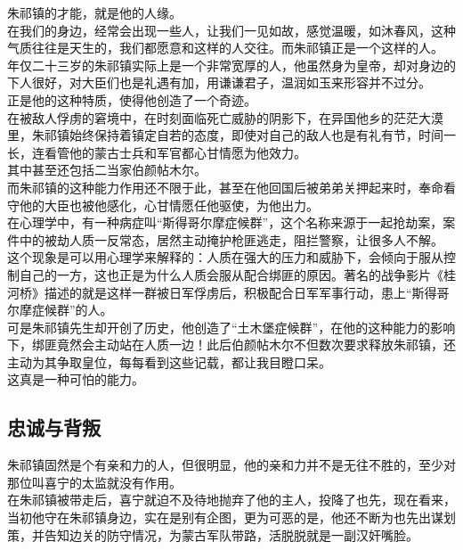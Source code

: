 \begin{multicols}{\theparacolNo}
朱祁镇的才能，就是他的人缘。\\

在我们的身边，经常会出现一些人，让我们一见如故，感觉温暖，如沐春风，这种气质往往是天生的，我们都愿意和这样的人交往。而朱祁镇正是一个这样的人。\\

年仅二十三岁的朱祁镇实际上是一个非常宽厚的人，他虽然身为皇帝，却对身边的下人很好，对大臣们也是礼遇有加，用谦谦君子，温润如玉来形容并不过分。\\

正是他的这种特质，使得他创造了一个奇迹。\\

在被敌人俘虏的窘境中，在时刻面临死亡威胁的阴影下，在异国他乡的茫茫大漠里，朱祁镇始终保持着镇定自若的态度，即使对自己的敌人也是有礼有节，时间一长，连看管他的蒙古士兵和军官都心甘情愿为他效力。\\

其中甚至还包括二当家伯颜帖木尔。\\

而朱祁镇的这种能力作用还不限于此，甚至在他回国后被弟弟关押起来时，奉命看守他的大臣也被他感化，心甘情愿任他驱使，为他出力。\\

在心理学中，有一种病症叫“斯得哥尔摩症候群”，这个名称来源于一起抢劫案，案件中的被劫人质一反常态，居然主动掩护枪匪逃走，阻拦警察，让很多人不解。\\

这个现象是可以用心理学来解释的：人质在强大的压力和威胁下，会倾向于服从控制自己的一方，这也正是为什么人质会服从配合绑匪的原因。著名的战争影片《桂河桥》描述的就是这样一群被日军俘虏后，积极配合日军军事行动，患上“斯得哥尔摩症候群”的人。\\

可是朱祁镇先生却开创了历史，他创造了“土木堡症候群”，在他的这种能力的影响下，绑匪竟然会主动站在人质一边！此后伯颜帖木尔不但数次要求释放朱祁镇，还主动为其争取皇位，每每看到这些记载，都让我目瞪口呆。\\

这真是一种可怕的能力。\\

\subsection{忠诚与背叛}
朱祁镇固然是个有亲和力的人，但很明显，他的亲和力并不是无往不胜的，至少对那位叫喜宁的太监就没有作用。\\

在朱祁镇被带走后，喜宁就迫不及待地抛弃了他的主人，投降了也先，现在看来，当初他守在朱祁镇身边，实在是别有企图，更为可恶的是，他还不断为也先出谋划策，并告知边关的防守情况，为蒙古军队带路，活脱脱就是一副汉奸嘴脸。\\


\end{multicols}
